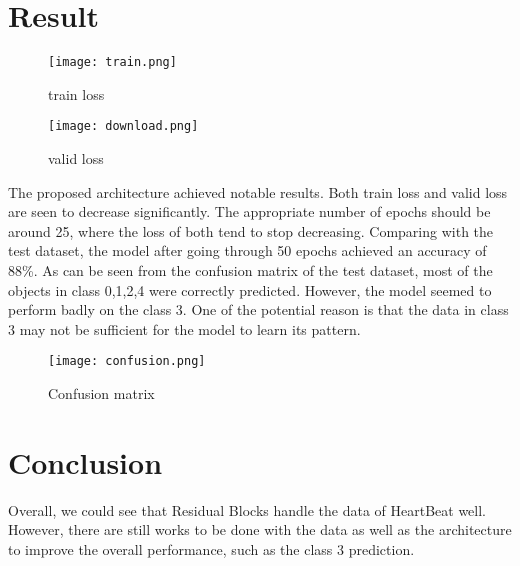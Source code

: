 \documentclass[hidelinks]{report}
\begin{document}
\section{Result}
\begin{figure}[h]
  \centering
  \begin{minipage}[b]{0.4\textwidth}
    \texttt{[image: train.png]}
    \caption{train loss}
  \end{minipage}
  \hfill
  \centering
  \begin{minipage}[b]{0.4\textwidth}
    \texttt{[image: download.png]}
    \caption{valid loss}
  \end{minipage}
\end{figure}

The proposed architecture achieved notable results. Both train loss and valid loss are seen to decrease significantly. The appropriate number of epochs should be around 25, where the loss of both tend to stop decreasing.
Comparing with the test dataset, the model after going through 50 epochs achieved an accuracy of 88\%. As can be seen from the confusion matrix of the test dataset, most of the objects in class 0,1,2,4 were correctly predicted. However, the model seemed to perform badly on the class 3. One of the potential reason is that the data in class 3 may not be sufficient for the model to learn its pattern. 
\begin{figure}[H]
    \centering
    \texttt{[image: confusion.png]}
    \caption{Confusion matrix}
    \label{fig:enter-label}
\end{figure}
\section{Conclusion}
Overall, we could see that Residual Blocks handle the data of HeartBeat well. However, there are still works to be done with the data as well as the architecture to improve the overall performance, such as the class 3 prediction.
\end{document}
